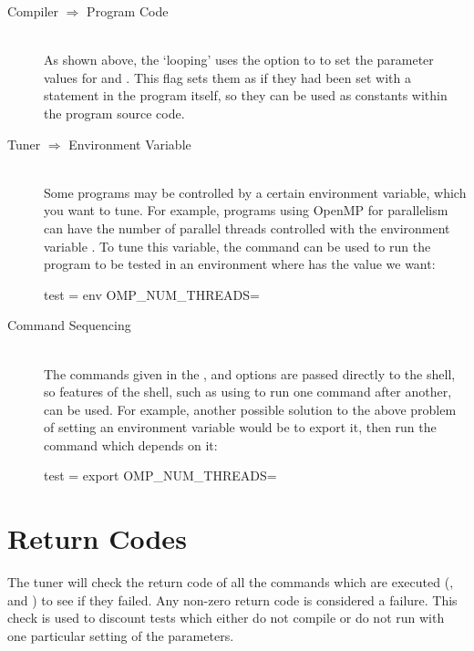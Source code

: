 \documentclass[a4paper, draft]{article}
\begin{document}
\begin{description}
\item[Compiler $\Longrightarrow$ Program Code] \hfill\\
    As shown above, the `looping'  uses the  
    option to  to set the parameter values for  and 
    . This flag sets them as if they had been set with a 
     statement in the program itself, so they can be 
    used as constants within the program source code.
    



\item[Tuner $\Longrightarrow$ Environment Variable] \hfill\\
    Some programs may be controlled by a certain environment variable, which 
    you want to tune. For example, programs using OpenMP for parallelism 
    can have the number of parallel threads controlled with the environment 
    variable . To tune this variable, the 
     command can be used to run the program to be tested in 
    an environment where  has the value we want:
    \begin{Code}[numbers=none]
test = env OMP_NUM_THREADS=%
    \end{Code}
    
    
    
\item[Command Sequencing] \hfill\\
    The commands given in the ,  and 
     options are passed directly to the shell, so features 
    of the shell, such as using \command{;} to run one command after another, 
    can be used. For example, another possible solution to the above problem 
    of setting an environment variable would be to export it, then run the 
    command which depends on it:
    \begin{Code}[numbers=none]
test = export OMP_NUM_THREADS=%
    \end{Code}
    
    


\end{description}








\clearpage


\section{Return Codes}
The tuner will check the return code of all the commands which are executed 
(,  and ) to see 
if they failed. Any non-zero return code is considered a failure. This check 
is used to discount tests which either do not compile or do not run with one 
particular setting of the parameters. 
\end{document}
